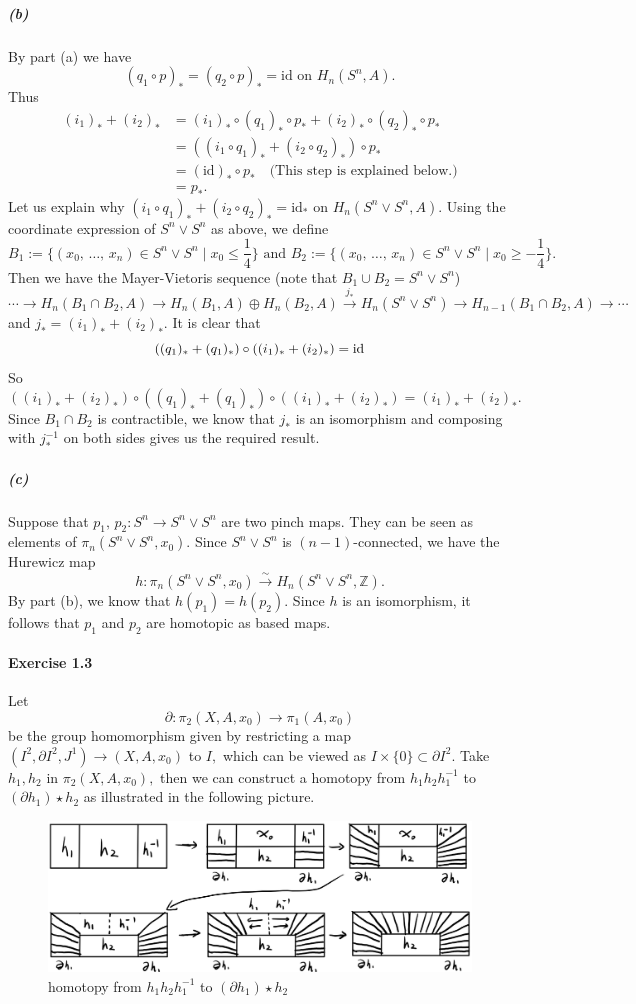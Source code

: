 \documentclass{article}
\begin{document}
\subparagraph{(b)}By part (a) we have
\[(q_1\circ p)_*=(q_2\circ p)_*=\mathrm{id}\text{ on }H_n(S^n,A).\]
Thus
\begin{align*}
  (i_1)_*+(i_2)_* & =(i_1)_*\circ (q_1)_*\circ p_*+(i_2)_*\circ (q_2)_*\circ p_* \\
   & =((i_1\circ q_1)_*+(i_2\circ q_2)_*)\circ p_* \\
   & =(\mathrm{id})_*\circ p_*\quad\text{(This step is explained below.)}\\
   & =p_*.
\end{align*}
Let us explain why $(i_1\circ q_1)_*+(i_2\circ q_2)_*=\mathrm{id}_*$ on $H_n(S^n\vee S^n, A).$ Using the coordinate expression of $S^n\vee S^n$ as above, we define
\[B_1:=\{(x_0,\,\ldots,\,x_n)\in S^n\vee S^n\mid x_0\leq \frac{1}{4}\}\text{ and }B_2:=\{(x_0,\,\ldots,\,x_n)\in S^n\vee S^n\mid x_0\geq -\frac{1}{4}\}.\]
Then we have the Mayer-Vietoris sequence (note that $B_1\cup B_2=S^n\vee S^n$)
\[\cdots\rightarrow H_n(B_1\cap B_2,A)\rightarrow H_n(B_1,A)\oplus H_n(B_2,A)\overset{j_*}\rightarrow H_n(S^n\vee S^n)\rightarrow H_{n-1}(B_1\cap B_2,A)\rightarrow\cdots\]
and $j_*=(i_1)_*+(i_2)_*.$ It is clear that
\[((q_1)_*+(q_1)_*)\circ((i_1)_*+(i_2)_*)=\rm{id}\]
So
\[((i_1)_*+(i_2)_*)\circ((q_1)_*+(q_1)_*)\circ((i_1)_*+(i_2)_*)=(i_1)_*+(i_2)_*.\]
Since $B_1\cap B_2$ is contractible, we know that $j_*$ is an isomorphism and composing with $j_*^{-1}$ on both sides gives us the required result.
\subparagraph{(c)}Suppose that $p_1,\,p_2\colon S^n\rightarrow S^n\vee S^n$ are two pinch maps. They can be seen as elements of $\pi_n(S^n\vee S^n, x_0).$ Since $S^n\vee S^n$ is $(n-1)$-connected, we have the Hurewicz map
\[h\colon\pi_n(S^n\vee S^n, x_0)\overset{\sim}\rightarrow H_n(S^n\vee S^n,\mathbb{Z}).\]
By part (b), we know that $h(p_1)=h(p_2).$ Since $h$ is an isomorphism, it follows that $p_1$ and $p_2$ are homotopic as based maps.
\paragraph{Exercise 1.3}Let
\[\partial\colon\pi_2(X,A,x_0)\rightarrow\pi_1(A,x_0)\]
be the group homomorphism given by restricting a map $(I^2,\partial I^2, J^1)\rightarrow(X,A,x_0)$ to $I,$ which can be viewed as $I\times\{0\}\subset\partial I^2.$ Take $h_1,h_2$ in $\pi_2(X,A,x_0),$ then we can construct a homotopy from $h_1h_2h_1^{-1}$ to $(\partial h_1)\star h_2$ as illustrated in the following picture.
\begin{figure}[ht]
  \centering
  \includegraphics[width=13cm]{ES1_2.png}
  \caption{homotopy from $h_1h_2h_1^{-1}$ to $(\partial h_1)\star h_2$}
\end{figure}
\end{document}
